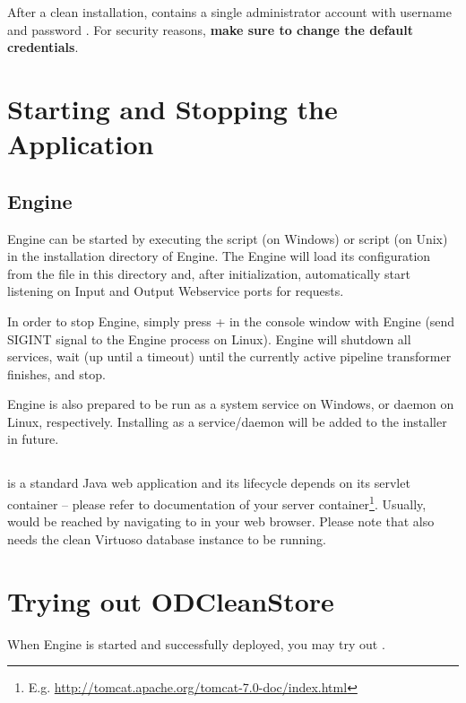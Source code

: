 After a clean installation, \FE contains a single administrator account with username  and password . For security reasons, \textbf{make sure to change the default credentials}.

\chapter{Starting and Stopping the Application}
\section{Engine}
\odcs Engine can be started by executing the  script (on Windows) or  script (on Unix) in the installation directory of \odcs Engine. The Engine will load its configuration from the  file in this directory and, after initialization, automatically start listening on Input and Output Webservice ports for requests.

In order to stop Engine, simply press + in the console window with Engine (send SIGINT signal to the Engine process on Linux). Engine will shutdown all services, wait (up until a timeout) until the currently active pipeline transformer finishes, and stop.

Engine is also prepared to be run as a system service on Windows, or daemon on Linux, respectively. Installing \odcs as a service/daemon will be added to the installer in future.

\section{\FE}
\FE is a standard Java web application and its lifecycle depends on its servlet container -- please refer to documentation of your server container\footnote{E.g. \url{http://tomcat.apache.org/tomcat-7.0-doc/index.html}}. Usually, \FE would be reached by navigating to  in your web browser. Please note that \FE also needs the clean Virtuoso database instance to be running.

\chapter{Trying out ODCleanStore}
When Engine is started and \FE successfully deployed, you may try out \odcs.

